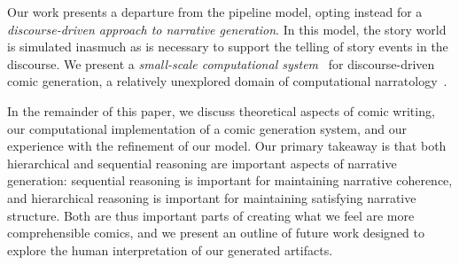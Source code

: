 Our work presents a departure from the pipeline model, opting instead for a
\emph{discourse-driven approach to narrative generation}. In this model, the
story world is simulated inasmuch as is necessary to support the telling of
story events in the discourse. We present a \emph{small-scale computational
system}~\cite{montfort2012small} for discourse-driven comic generation, a
relatively unexplored domain of computational narratology~\cite{mani2012computational}.

In the remainder of this paper, we discuss theoretical aspects of comic writing, our computational implementation of a comic generation system, and our experience with the refinement of our model. Our primary takeaway is that both hierarchical and sequential reasoning are important aspects of narrative generation: sequential reasoning is important for maintaining narrative coherence, and hierarchical reasoning is important for maintaining satisfying narrative structure. Both are thus important parts of creating what we feel are more comprehensible comics, and we present an outline of future work designed to explore the human interpretation of our generated artifacts.



